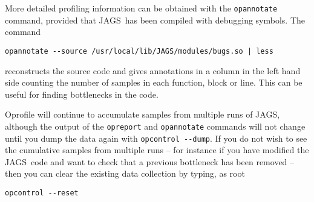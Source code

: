 \documentclass[11pt, a4paper, titlepage]{report}
\newcommand{\JAGS}{\textsf{JAGS}}
\begin{document}
More detailed profiling information can be obtained with the
\verb+opannotate+ command, provided that \JAGS\ has been compiled
with debugging symbols. The command
\begin{verbatim}
opannotate --source /usr/local/lib/JAGS/modules/bugs.so | less
\end{verbatim}
reconstructs the source code and gives annotations in a column in
the left hand side counting the number of samples in each function,
block or line. This can be useful for finding bottlenecks in the code.

Oprofile will continue to accumulate samples from multiple runs of JAGS,
although the output of the \verb+opreport+ and \verb+opannotate+ commands
will not change until you dump the data again with \verb+opcontrol --dump+.
If you do not wish to see the cumulative samples from multiple runs --
for instance if you have modified the \JAGS\ code and want to check that
a previous bottleneck has been removed -- then you can clear the existing
data collection by typing, as root
\begin{verbatim}
opcontrol --reset
\end{verbatim}
\end{document}
